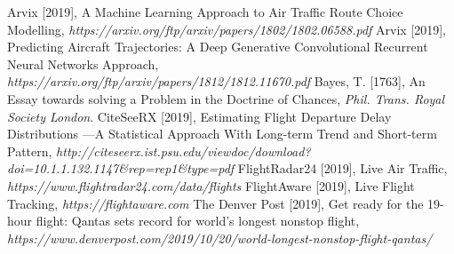 \begin{thebibliography}{99}
 Arvix [2019], A Machine Learning Approach to Air Traffic Route Choice Modelling, {\it https://arxiv.org/ftp/arxiv/papers/1802/1802.06588.pdf}
 Arvix [2019], Predicting Aircraft Trajectories: A Deep Generative Convolutional Recurrent Neural Networks Approach, {\it https://arxiv.org/ftp/arxiv/papers/1812/1812.11670.pdf}
 Bayes, T. [1763], An Essay towards solving a Problem in the Doctrine of Chances, {\it Phil. Trans. Royal Society London}.
 CiteSeeRX [2019], Estimating Flight Departure Delay Distributions —A Statistical Approach With Long-term Trend and Short-term Pattern, {\it http://citeseerx.ist.psu.edu/viewdoc/download?doi=10.1.1.132.1147\&rep=rep1\&type=pdf}
 FlightRadar24 [2019], Live Air Traffic, {\it https://www.flightradar24.com/data/flights}
 FlightAware [2019], Live Flight Tracking, {\it https://flightaware.com}
 The Denver Post [2019], Get ready for the 19-hour flight: Qantas sets record for world’s longest nonstop flight, {\it https://www.denverpost.com/2019/10/20/world-longest-nonstop-flight-qantas/}
\end{thebibliography}


